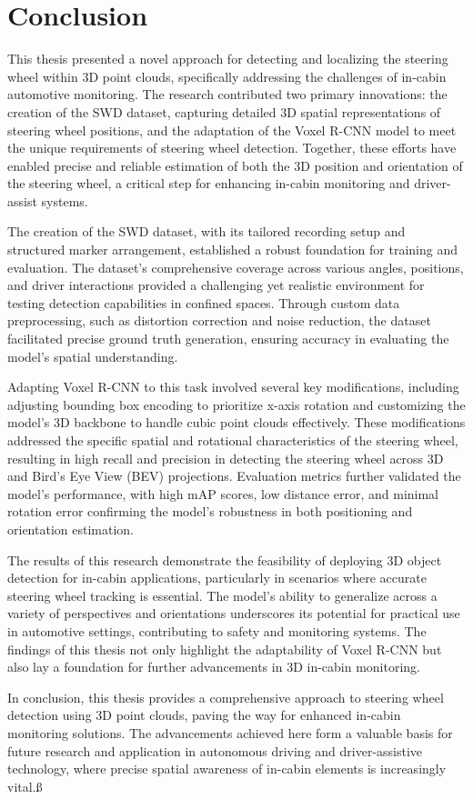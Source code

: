 \chapter{Conclusion}

This thesis presented a novel approach for detecting and localizing the steering wheel within 3D point clouds, specifically addressing the challenges of in-cabin automotive monitoring. The research contributed two primary innovations: the creation of the SWD dataset, capturing detailed 3D spatial representations of steering wheel positions, and the adaptation of the Voxel R-CNN model to meet the unique requirements of steering wheel detection. Together, these efforts have enabled precise and reliable estimation of both the 3D position and orientation of the steering wheel, a critical step for enhancing in-cabin monitoring and driver-assist systems.

The creation of the SWD dataset, with its tailored recording setup and structured marker arrangement, established a robust foundation for training and evaluation. The dataset’s comprehensive coverage across various angles, positions, and driver interactions provided a challenging yet realistic environment for testing detection capabilities in confined spaces. Through custom data preprocessing, such as distortion correction and noise reduction, the dataset facilitated precise ground truth generation, ensuring accuracy in evaluating the model’s spatial understanding.

Adapting Voxel R-CNN to this task involved several key modifications, including adjusting bounding box encoding to prioritize x-axis rotation and customizing the model’s 3D backbone to handle cubic point clouds effectively. These modifications addressed the specific spatial and rotational characteristics of the steering wheel, resulting in high recall and precision in detecting the steering wheel across 3D and Bird’s Eye View (BEV) projections. Evaluation metrics further validated the model’s performance, with high mAP scores, low distance error, and minimal rotation error confirming the model’s robustness in both positioning and orientation estimation.

The results of this research demonstrate the feasibility of deploying 3D object detection for in-cabin applications, particularly in scenarios where accurate steering wheel tracking is essential. The model’s ability to generalize across a variety of perspectives and orientations underscores its potential for practical use in automotive settings, contributing to safety and monitoring systems. The findings of this thesis not only highlight the adaptability of Voxel R-CNN but also lay a foundation for further advancements in 3D in-cabin monitoring.

In conclusion, this thesis provides a comprehensive approach to steering wheel detection using 3D point clouds, paving the way for enhanced in-cabin monitoring solutions. The advancements achieved here form a valuable basis for future research and application in autonomous driving and driver-assistive technology, where precise spatial awareness of in-cabin elements is increasingly vital.ß